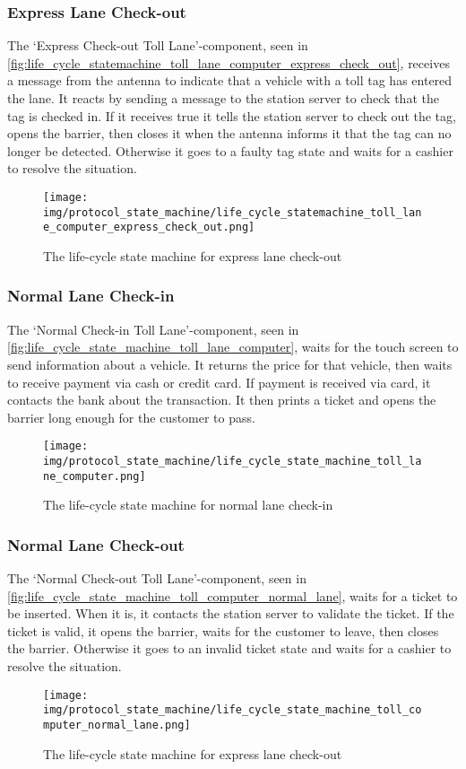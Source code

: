 \subsubsection*{Express Lane Check-out}
The ‘Express Check-out Toll Lane’-component, seen in \autoref{fig:life_cycle_statemachine_toll_lane_computer_express_check_out}, receives a message from the antenna to indicate that a vehicle with a toll tag has entered the lane. It reacts by sending a message to the station server to check that the tag is checked in. If it receives true it tells the station server to check out the tag, opens the barrier, then closes it when the antenna informs it that the tag can no longer be detected.  Otherwise it goes to a faulty tag state and waits for a cashier to resolve the situation. 
\begin{figure}
\centering
\texttt{[image: img/protocol\_state\_machine/life\_cycle\_statemachine\_toll\_lane\_computer\_express\_check\_out.png]}
\caption{The life-cycle state machine for express lane check-out}
\label{fig:life_cycle_statemachine_toll_lane_computer_express_check_out}
\end{figure}

\subsubsection*{Normal Lane Check-in}
The ‘Normal Check-in Toll Lane’-component, seen in \autoref{fig:life_cycle_state_machine_toll_lane_computer}, waits for the touch screen to send information about a vehicle. It returns the price for that vehicle, then waits to receive payment via cash or credit card. If payment is received via card, it contacts the bank about the transaction. It then prints a ticket and opens the barrier long enough for the customer to pass.
\begin{figure}
\centering
\texttt{[image: img/protocol\_state\_machine/life\_cycle\_state\_machine\_toll\_lane\_computer.png]}
\caption{The life-cycle state machine for normal lane check-in}
\label{fig:life_cycle_state_machine_toll_lane_computer}
\end{figure}

\subsubsection*{Normal Lane Check-out}
The ‘Normal Check-out Toll Lane’-component, seen in \autoref{fig:life_cycle_state_machine_toll_computer_normal_lane}, waits for a ticket to be inserted. When it is, it contacts the station server to validate the ticket. If the ticket is valid, it opens the barrier, waits for the customer to leave, then closes the barrier. Otherwise it goes to an invalid ticket state and waits for a cashier to resolve the situation.
\begin{figure}
\centering
\texttt{[image: img/protocol\_state\_machine/life\_cycle\_state\_machine\_toll\_computer\_normal\_lane.png]}
\caption{The life-cycle state machine for express lane check-out}
\label{fig:life_cycle_state_machine_toll_computer_normal_lane}
\end{figure}


